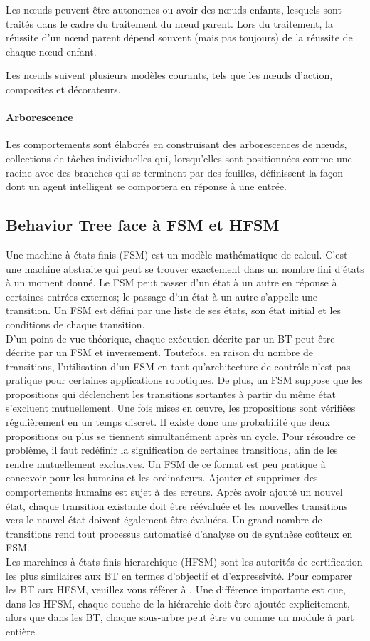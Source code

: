 \documentclass[titlepage]{article}
\begin{document}
		Les nœuds peuvent être autonomes ou avoir des nœuds enfants, lesquels sont traités dans le cadre du traitement du nœud parent. Lors du traitement, la réussite d'un nœud parent dépend souvent (mais pas toujours) de la réussite de chaque nœud enfant.
		
		Les nœuds suivent plusieurs modèles courants, tels que les nœuds d'action, composites et décorateurs. \cite{documentation_aws}
		
		\paragraph{Arborescence}
		Les comportements sont élaborés en construisant des arborescences de nœuds, collections de tâches individuelles qui, lorsqu'elles sont positionnées comme une racine avec des branches qui se terminent par des feuilles, définissent la façon dont un agent intelligent se comportera en réponse à une entrée. \cite{documentation_aws}	
		\subsection{Behavior Tree face à FSM et HFSM}
		Une machine à états finis (FSM) est un modèle mathématique de calcul. C'est une machine abstraite qui peut se trouver exactement dans un nombre fini d'états à un moment donné. Le FSM peut passer d'un état à un autre en réponse à certaines entrées externes; le passage d'un état à un autre s'appelle une transition. Un FSM est défini par une liste de ses états, son état initial et les conditions de chaque transition.
		\\
		D'un point de vue théorique, chaque exécution décrite par un BT peut être décrite par un FSM et inversement. Toutefois, en raison du nombre de transitions, l'utilisation d'un FSM en tant qu'architecture de contrôle n'est pas pratique pour certaines applications robotiques. De plus, un FSM suppose que les propositions qui déclenchent les transitions sortantes à partir du même état s’excluent mutuellement. Une fois mises en œuvre, les propositions sont vérifiées régulièrement en un temps discret. Il existe donc une probabilité que deux propositions ou plus se tiennent simultanément après un cycle. Pour résoudre ce problème, il faut redéfinir la signification de certaines transitions, afin de les rendre mutuellement exclusives. Un FSM de ce format est peu pratique à concevoir pour les humains et les ordinateurs. Ajouter et supprimer des comportements humains est sujet à des erreurs. Après avoir ajouté un nouvel état, chaque transition existante doit être réévaluée et les nouvelles transitions vers le nouvel état doivent également être évaluées. Un grand nombre de transitions rend tout processus automatisé d'analyse ou de synthèse coûteux en FSM.
		\\
		Les marchines à états finis hierarchique (HFSM) sont les autorités de certification les plus similaires aux BT en termes d'objectif et d'expressivité. Pour comparer les BT aux HFSM, veuillez vous référer à \cite{colledanchise_2017}. Une différence importante est que, dans les HFSM, chaque couche de la hiérarchie doit être ajoutée explicitement, alors que dans les BT, chaque sous-arbre peut être vu comme un module à part entière.
\end{document}
